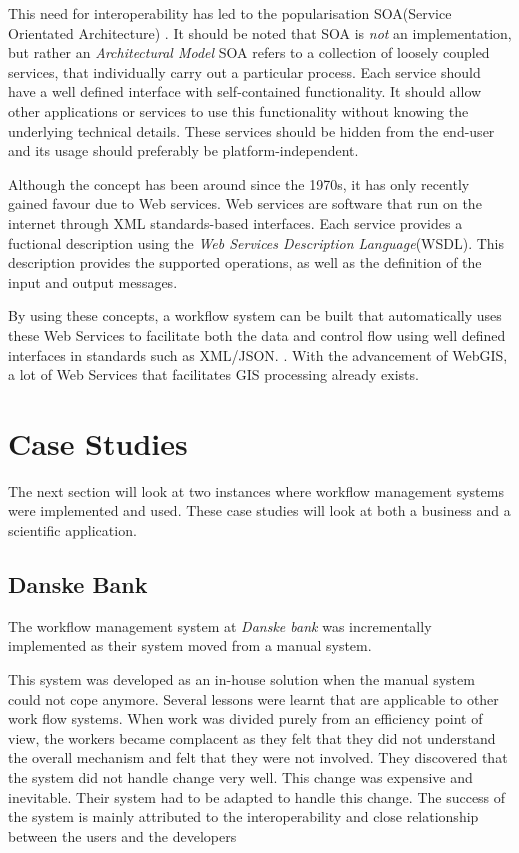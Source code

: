 \documentclass[11pt,twocolumn]{article}
\begin{document}
    This need for interoperability has led to the
    popularisation SOA(Service Orientated Architecture)
    \cite{Sanders:2008:SSA:1400549.1400595}.
    It should be noted that SOA is \emph{not} an implementation,
    but rather an \emph{Architectural Model}
    SOA refers to a collection of loosely coupled services,
    that individually carry out a particular process. Each
    service should have a well defined interface with self-contained
    functionality. It should allow other applications
    or services to use this functionality without knowing
    the underlying technical details. These services should be
    hidden from the end-user and its usage should preferably
    be platform-independent.

    Although the concept has been around since the 1970s,
    it has only recently gained favour due to Web services.
    Web services are software that run on the internet through
    XML standards-based interfaces\cite{Tai:2004:CCW:1045658.1045680}.
    Each service provides a fuctional description using the
    \emph{Web Services Description Language}(WSDL).
    This description provides the supported operations, as
    well as the definition of the input and output messages.

    By using these concepts, a workflow system can
    be built that automatically uses these Web Services
    to facilitate both the data and control flow using
    well defined interfaces in standards such as XML/JSON.
    \cite{Shegalov:2001:XWM:767132.767139}. With the
    advancement of WebGIS, a lot  of Web Services
    that facilitates GIS processing already exists.


\section{Case Studies}
    The next section will look at two instances where
    workflow management systems were implemented and used.
    These case studies will look at both a business and a
    scientific application.
    \subsection*{Danske Bank}
      The workflow management system at \emph{Danske bank} was
      incrementally implemented as their system moved
      from a manual system\cite{Brahe:2007:SWW:1316624.1316661}.

      This system was developed as an in-house solution when
      the manual system could not cope anymore.
      Several lessons were learnt that
      are applicable to other work flow systems. When work
      was divided purely from an efficiency point of view,
      the workers became complacent as they felt that they
      did not understand the overall mechanism and felt that
      they were not involved. They discovered that the
      system did not handle change very well. This change
      was expensive and inevitable. Their system had
      to be adapted to handle this change. The success of the
      system is mainly attributed to the interoperability and
      close relationship between the users and the developers
\end{document}
